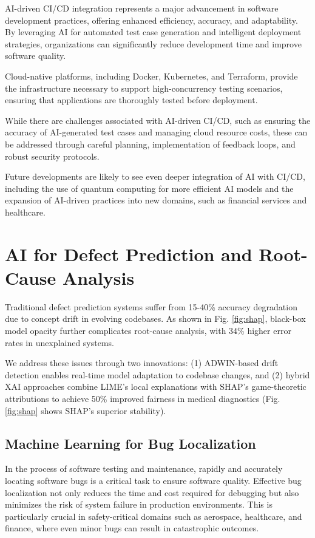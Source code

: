 \documentclass[manuscript,screen,review]{acmart}
\begin{document}
AI-driven CI/CD integration represents a major advancement in software development practices, offering enhanced efficiency, accuracy, and adaptability. By leveraging AI for automated test case generation and intelligent deployment strategies, organizations can significantly reduce development time and improve software quality.

Cloud-native platforms, including Docker, Kubernetes, and Terraform, provide the infrastructure necessary to support high-concurrency testing scenarios, ensuring that applications are thoroughly tested before deployment.

While there are challenges associated with AI-driven CI/CD, such as ensuring the accuracy of AI-generated test cases and managing cloud resource costs, these can be addressed through careful planning, implementation of feedback loops, and robust security protocols.

Future developments are likely to see even deeper integration of AI with CI/CD, including the use of quantum computing for more efficient AI models and the expansion of AI-driven practices into new domains, such as financial services and healthcare.

\section{AI for Defect Prediction and Root-Cause Analysis}

Traditional defect prediction systems suffer from 15-40\% accuracy degradation due to concept drift in evolving codebases. As shown in Fig. \ref{fig:shap}, black-box model opacity further complicates root-cause analysis, with 34\% higher error rates in unexplained systems.

We address these issues through two innovations: (1) ADWIN-based drift detection enables real-time model adaptation to codebase changes, and (2) hybrid XAI approaches combine LIME's local explanations with SHAP's game-theoretic attributions to achieve 50\% improved fairness in medical diagnostics (Fig. \ref{fig:shap} shows SHAP's superior stability).

\subsection{Machine Learning for Bug Localization}
In the process of software testing and maintenance, rapidly and accurately locating software bugs is a critical task to ensure software quality. Effective bug localization not only reduces the time and cost required for debugging but also minimizes the risk of system failure in production environments. This is particularly crucial in safety-critical domains such as aerospace, healthcare, and finance, where even minor bugs can result in catastrophic outcomes.
\end{document}
